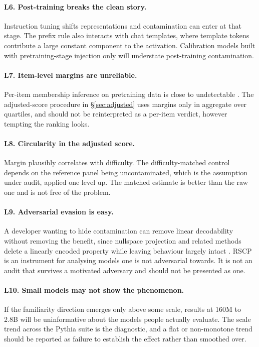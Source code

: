 \documentclass[10pt,twocolumn,letterpaper]{article}
\begin{document}
\paragraph{L6. Post-training breaks the clean story.} Instruction tuning shifts representations and contamination can enter at that stage. The prefix rule also interacts with chat templates, where template tokens contribute a large constant component to the activation. Calibration models built with pretraining-stage injection only will understate post-training contamination.

\paragraph{L7. Item-level margins are unreliable.} Per-item membership inference on pretraining data is close to undetectable \cite{duan2024mia}. The adjusted-score procedure in \S\ref{sec:adjusted} uses margins only in aggregate over quartiles, and should not be reinterpreted as a per-item verdict, however tempting the ranking looks.

\paragraph{L8. Circularity in the adjusted score.} Margin plausibly correlates with difficulty. The difficulty-matched control depends on the reference panel being uncontaminated, which is the assumption under audit, applied one level up. The matched estimate is better than the raw one and is not free of the problem.

\paragraph{L9. Adversarial evasion is easy.} A developer wanting to hide contamination can remove linear decodability without removing the benefit, since nullspace projection and related methods delete a linearly encoded property while leaving behaviour largely intact \cite{ravfogel2020inlp,elazar2021amnesic}. RSCP is an instrument for analysing models one is not adversarial towards. It is not an audit that survives a motivated adversary and should not be presented as one.

\paragraph{L10. Small models may not show the phenomenon.} If the familiarity direction emerges only above some scale, results at 160M to 2.8B will be uninformative about the models people actually evaluate. The scale trend across the Pythia suite is the diagnostic, and a flat or non-monotone trend should be reported as failure to establish the effect rather than smoothed over.
\end{document}
